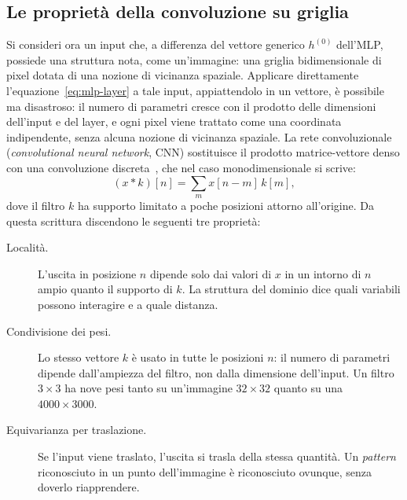 \subsection{Le proprietà della convoluzione su griglia}

Si consideri ora un input che, a differenza del vettore generico $h^{(0)}$ dell'MLP, possiede una struttura nota, come un'immagine: una griglia bidimensionale di pixel dotata di una nozione di vicinanza spaziale. Applicare direttamente l'equazione~\eqref{eq:mlp-layer} a tale input, appiattendolo in un vettore, è possibile ma disastroso: il numero di parametri cresce con il prodotto delle dimensioni dell'input e del layer, e ogni pixel viene trattato come una coordinata indipendente, senza alcuna nozione di vicinanza spaziale. La rete convoluzionale (\emph{convolutional neural network}, CNN) sostituisce il prodotto matrice-vettore denso con una convoluzione discreta~\cite{lecun1998gradient}, che nel caso monodimensionale si scrive:
\begin{equation}
\label{eq:discrete-convolution}
(x \ast k)[n] = \sum_{m} x[n-m]\,k[m],
\end{equation}
dove il filtro $k$ ha supporto limitato a poche posizioni attorno all'origine. Da questa scrittura discendono le seguenti tre proprietà:

\begin{description}
    \item[Località.] L'uscita in posizione $n$ dipende solo dai valori di $x$ in un intorno di $n$ ampio quanto il supporto di $k$. La struttura del dominio dice quali variabili possono interagire e a quale distanza.
    \item[Condivisione dei pesi.] Lo stesso vettore $k$ è usato in tutte le posizioni $n$: il numero di parametri dipende dall'ampiezza del filtro, non dalla dimensione dell'input. Un filtro $3\times3$ ha nove pesi tanto su un'immagine $32\times32$ quanto su una $4000\times3000$.
    \item[Equivarianza per traslazione.] Se l'input viene traslato, l'uscita si trasla della stessa quantità. Un \emph{pattern} riconosciuto in un punto dell'immagine è riconosciuto ovunque, senza doverlo riapprendere.
\end{description}

